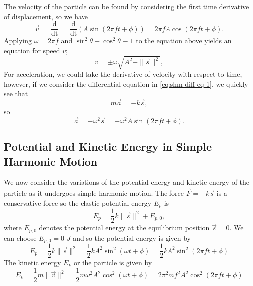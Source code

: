 The velocity of the particle can be found by considering the first time derivative of displacement, so we have
\begin{equation}
    \vec{v} = \frac{\mathop{\mathrm{d}\vec{s}}}{\mathop{\mathrm{d}t}} = \frac{\mathrm{d}}{\mathop{\mathrm{d}t}} (A \sin(2\pi ft + \phi)) = 2 \pi f A \cos(2\pi f t + \phi).
\end{equation}
Applying $\omega = 2\pi f$ and $\sin^2 \theta + \cos^2 \theta \equiv 1$ to the equation above yields an equation for speed $v$;
\begin{equation*}
    v = \pm \omega \sqrt{A^2 - \| \vec{s} \|^2},
\end{equation*}
For acceleration, we could take the derivative of velocity with respect to time, however, if we consider the differential equation in \ref{eq:shm-diff-eq-1}, we quickly see that
\begin{equation*}
    m \vec{a} = - k \vec{s},
\end{equation*}
so 
\begin{equation}
    \vec{a} = - \omega^2 \vec{s} = -\omega^2 A \sin(2 \pi f t + \phi).
\end{equation}

\subsection{Potential and Kinetic Energy in Simple Harmonic Motion}

We now consider the variations of the potential energy and kinetic energy of the particle as it undergoes simple harmonic motion. The force $\vec{F} = - k \vec{s}$ is a conservative force so the elastic potential energy $E_p$ is 
\begin{equation}
    E_p = \frac{1}{2} k \| \vec{s} \|^2 + E_{p, 0},
\end{equation}
where $E_{p,0}$ denotes the potential energy at the equilibrium position $\vec{s} = 0$. We can choose $E_{p, 0} = 0$ $J$ and so the potential energy is given by
\begin{equation}
    E_p = \frac{1}{2} k \| \vec{s} \|^2 = \frac{1}{2} k A^2 \sin^2 (\omega t + \phi) = \frac{1}{2} k A^2 \sin^2 (2 \pi f t + \phi)
\end{equation}
The kinetic energy $E_k$ or the particle is given by
\begin{equation}
    E_k = \frac{1}{2} m \| \vec{v} \|^2 = \frac{1}{2}m \omega^2 A^2 \cos^2(\omega t + \phi) = 2 \pi^2 m f^2 A^2 \cos^2 (2 \pi f t + \phi)
\end{equation}


